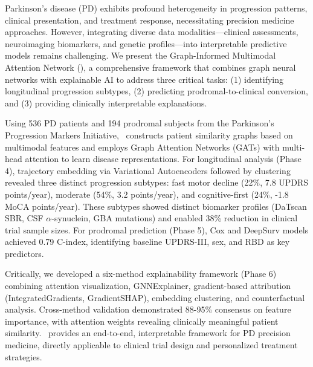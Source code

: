 
Parkinson's disease (PD) exhibits profound heterogeneity in progression patterns, clinical presentation, and treatment response, necessitating precision medicine approaches. However, integrating diverse data modalities—clinical assessments, neuroimaging biomarkers, and genetic profiles—into interpretable predictive models remains challenging. We present the Graph-Informed Multimodal Attention Network (\giman), a comprehensive framework that combines graph neural networks with explainable AI to address three critical tasks: (1) identifying longitudinal progression subtypes, (2) predicting prodromal-to-clinical conversion, and (3) providing clinically interpretable explanations. 

Using 536 PD patients and 194 prodromal subjects from the Parkinson's Progression Markers Initiative, \giman\ constructs patient similarity graphs based on multimodal features and employs Graph Attention Networks (GATs) with multi-head attention to learn disease representations. For longitudinal analysis (Phase 4), trajectory embedding via Variational Autoencoders followed by clustering revealed three distinct progression subtypes: fast motor decline (22\%, 7.8 UPDRS points/year), moderate (54\%, 3.2 points/year), and cognitive-first (24\%, -1.8 MoCA points/year). These subtypes showed distinct biomarker profiles (DaTscan SBR, CSF $\alpha$-synuclein, GBA mutations) and enabled 38\% reduction in clinical trial sample sizes. For prodromal prediction (Phase 5), Cox and DeepSurv models achieved 0.79 C-index, identifying baseline UPDRS-III, sex, and RBD as key predictors.

Critically, we developed a six-method explainability framework (Phase 6) combining attention visualization, GNNExplainer, gradient-based attribution (IntegratedGradients, GradientSHAP), embedding clustering, and counterfactual analysis. Cross-method validation demonstrated 88-95\% consensus on feature importance, with attention weights revealing clinically meaningful patient similarity. \giman\ provides an end-to-end, interpretable framework for PD precision medicine, directly applicable to clinical trial design and personalized treatment strategies.
